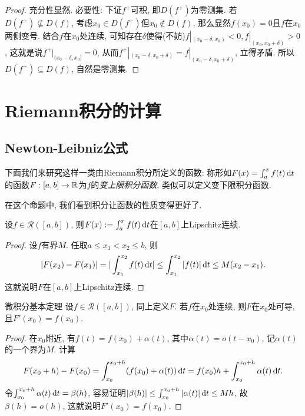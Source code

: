 \begin{proof}
	充分性显然. 必要性: 下证$f^+$可积, 即$D(f^+)$为零测集. 若$D(f^+) \nsubseteq D(f)$, 考虑$x_0 \in D(f^+)$但$x_0 \notin D(f)$, 那么显然$f(x_0)=0$且$f$在$x_0$两侧变号. 结合$f$在$x_0$处连续, 可知存在$\delta$使得(不妨)$f|_{(x_0-\delta,x_0)}<0,f|_{(x_0,x_0+\delta)}>0$, 这就是说$f^+|_{(x_0-\delta,x_0]}=0$, 从而$f^+|_{(x_0-\delta,x_0+\delta)} = f|_{(x_0-\delta,x_0+\delta)}$, 立得矛盾. 所以$D(f^+) \subseteq D(f)$, 自然是零测集. 
\end{proof}

\newpage
\section{Riemann积分的计算}

\subsection{Newton-Leibniz公式}

下面我们来研究这样一类由Riemann积分所定义的函数: 称形如$F(x)=\int_a^x f(t) \mathop{}\!\mathrm{d} t$的函数$F:[a,b] \to \mathbb{R}$为$f$的\textit{变上限积分函数}, 类似可以定义变下限积分函数. 

在这个命题中, 我们看到积分让函数的性质变得更好了. 

\begin{proposition}{} \label{pro:jiffvgze}
	设$f \in \mathcal{R}([a,b])$, 则$F(x):=\int_a^x f(t) \mathop{}\!\mathrm{d} t$在$[a,b]$上Lipschitz连续. 
\end{proposition}
\begin{proof}
	设$f$有界$M$. 任取$a \leq x_1 < x_2 \leq b$, 则$$|F(x_2)-F(x_1)| = |\int_{x_1}^{x_2} f(t) \mathop{}\!\mathrm{d} t| \leq \int_{x_1}^{x_2} |f(t)| \mathop{}\!\mathrm{d} t \leq M(x_2-x_1).$$
	这就说明$F$在$[a,b]$上Lipschitz连续. 
\end{proof}

\begin{theorem}{微积分基本定理}
	设$f \in \mathcal{R}([a,b])$, 同上定义$F$. 若$f$在$x_0$处连续, 则$F$在$x_0$处可导, 且$F'(x_0)=f(x_0)$. 
\end{theorem}
\begin{proof}
	在$x_0$附近, 有$f(t)=f(x_0)+\alpha (t)$, 其中$\alpha (t)=o(t-x_0)$, 记$\alpha (t)$的一个界为$M$. 计算$$F(x_0+h)-F(x_0)=\int_{x_0}^{x_0+h} (f(x_0)+\alpha (t)) \mathop{}\!\mathrm{d} t = f(x_0)h+\int_{x_0}^{x_0+h} \alpha (t) \mathop{}\!\mathrm{d} t.$$
	令$\int_{x_0}^{x_0+h}\alpha (t) \mathop{}\!\mathrm{d} t=\beta (h)$, 容易证明$|\beta (h)| \leq \int_{x_0}^{x_0+h} |\alpha (t)| \mathop{}\!\mathrm{d} t \leq Mh$, 故$\beta (h)=o(h)$, 这就说明$F'(x_0)=f(x_0)$. 
\end{proof}

